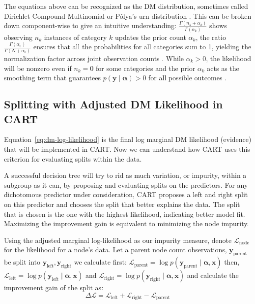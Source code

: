 The equations above can be recognized as the DM distribution, sometimes called Dirichlet Compound Multinomial or Pólya's urn distribution \parencite{mimno_polya}. This can be broken down component-wise to give an intuitive understanding: \( \frac{\Gamma(n_k + \alpha_k)}{\Gamma(\alpha_k)}\) shows observing \(n_k\) instances of category \(k\) updates the prior count \(\alpha_k\), the ratio \(\frac{\Gamma(\alpha_0)}{\Gamma(N + \alpha_0)}\) ensures that all the probabilities for all categories sum to 1, yielding the normalization factor across joint observation counts \parencite{gundersen2020dirichlet-multinomial, wiki:dirichlet-multinomial}. While \(\alpha_k > 0\), the likelihood will be nonzero even if \(n_k = 0\) for some categories and the prior \(\alpha_k\) acts as the smoothing term that guarantees \(p(\mathbf{y} \mid \boldsymbol{\alpha}) > 0\) for all possible outcomes \parencite{mimno_polya}. 

\subsection{Splitting with Adjusted DM Likelihood in CART}
\label{sec:ch3-splits-in-cart}
Equation~\ref{eq:dm-log-likelihood} is the final log marginal DM likelihood (evidence) that will be implemented in CART. Now we can understand how CART uses this criterion for evaluating splits within the data. 

A successful decision tree will try to rid as much variation, or impurity, within a subgroup as it can, by proposing and evaluating splits on the predictors. For any dichotomous predictor under consideration, CART proposes a left and right split on this predictor and chooses the split that better explains the data. The split that is chosen is the one with the highest likelihood, indicating better model fit. Maximizing the improvement gain is equivalent to minimizing the node impurity.

Using the adjusted marginal log-likelihood as our impurity measure, denote \(\mathcal{L}_{\text{node}}\) for the likelihood for a node's data. Let a parent node count observations, \(\mathbf{y}_{\text{parent}}\) be split into  \(\mathbf{y}_{\text{left}},\mathbf{y}_{\text{right}}\)  we calculate first: \( 
    \mathcal{L}_{\text{parent}} = \log p(\mathbf{y}_{\text{parent}} \mid \boldsymbol{\alpha}, \mathbf{x})
\) then, 
\(
    \mathcal{L}_{\text{left}} = \log p(\mathbf{y}_{\text{left}} \mid \boldsymbol{\alpha},\mathbf{x})
\)
and 
\(
    \mathcal{L}_{\text{right}} = \log p(\mathbf{y}_{\text{right}} \mid \boldsymbol{\alpha},\mathbf{x})
\) and calculate the improvement gain of the split as: 
\[
    \Delta \mathcal{L} = \mathcal{L}_{\text{left}} + \mathcal{L}_{\text{right}} - \mathcal{L}_{\text{parent}}
\]

